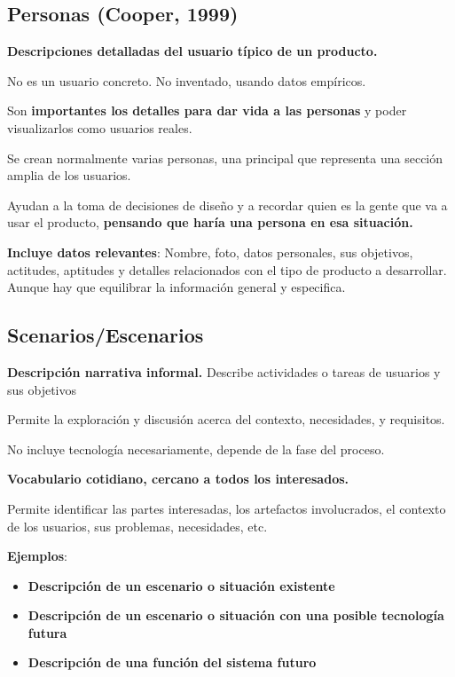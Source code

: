 \documentclass[12pt, twoside, openright]{report} %
\begin{document}
\subsection{Personas (Cooper, 1999)}

\textbf{Descripciones detalladas del usuario típico de un producto.}

No es un usuario concreto. No inventado, usando datos empíricos.

Son \textbf{importantes los detalles para dar vida a las personas} y
poder visualizarlos como usuarios reales.

Se crean normalmente varias personas, una principal que representa una
sección amplia de los usuarios.

Ayudan a la toma de decisiones de diseño y a recordar quien es la gente
que va a usar el producto, \textbf{pensando que haría una persona en esa
situación.}

\textbf{Incluye datos relevantes}: Nombre, foto, datos personales, sus
objetivos, actitudes, aptitudes y detalles relacionados con el tipo de
producto a desarrollar. Aunque hay que equilibrar la información general
y especifica.

\subsection{Scenarios/Escenarios}

\textbf{Descripción narrativa informal.} Describe actividades o tareas
de usuarios y sus objetivos

Permite la exploración y discusión acerca del contexto, necesidades, y
requisitos.

No incluye tecnología necesariamente, depende de la fase del proceso.

\textbf{Vocabulario cotidiano, cercano a todos los interesados.}

Permite identificar las partes interesadas, los artefactos involucrados,
el contexto de los usuarios, sus problemas, necesidades, etc.

\textbf{Ejemplos}:

\begin{itemize}

\item
  \textbf{Descripción de un escenario o situación existente}
\item
  \textbf{Descripción de un escenario o situación con una posible
  tecnología futura}
\item
  \textbf{Descripción de una función del sistema futuro}
\end{itemize}
\end{document}
